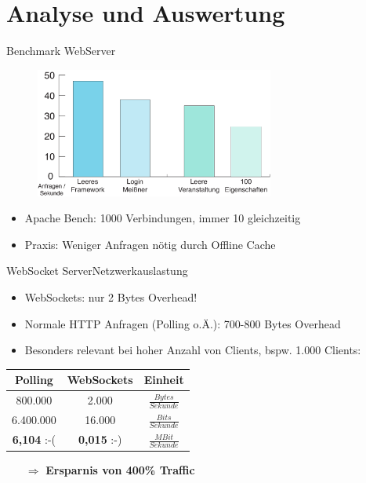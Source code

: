 \section{Analyse und Auswertung}

\begin{frame}{Benchmark WebServer}
	\begin{figure}
		\includegraphics[width=0.7\textwidth]{fig/statistiken_ab.pdf}
	\end{figure}
	\begin{itemize}
		\item Apache Bench: 1000 Verbindungen, immer 10 gleichzeitig
		\item Praxis: Weniger Anfragen nötig durch Offline Cache
	\end{itemize}
\end{frame}

\begin{frame}{WebSocket Server}{Netzwerkauslastung}
	\begin{itemize}
		\item WebSockets: nur 2 Bytes Overhead!
		\item Normale HTTP Anfragen (Polling o.Ä.): 700-800 Bytes Overhead
		\item Besonders relevant bei hoher Anzahl von Clients\pause, bspw. 1.000 Clients:
		\item[]
	\end{itemize}

	\renewcommand{\arraystretch}{1.4}
	\centering
	\begin{tabular}{c|c|c}
		\textbf{Polling} & \textbf{WebSockets} & Einheit\\
		\hline
		800.000 &  2.000 & $\frac{Bytes}{Sekunde}$\\
		6.400.000 &  16.000 & $\frac{Bits}{Sekunde}$\\
		{\color{red}\textbf{6,104} :-(} & {\color{blue}\textbf{0,015} :-)} & $\frac{MBit}{Sekunde}$\\
	\end{tabular}

	\begin{itemize}
		\item[]
		\item[$\Rightarrow$] {\color{red}\textbf{Ersparnis von 400\% Traffic}}
	\end{itemize}
\end{frame}

